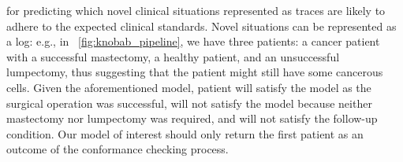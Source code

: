 for predicting which novel clinical situations represented as %
traces are likely to adhere to the expected clinical standards. Novel situations can be represented as a log: e.g., in \figurename~\ref{fig:knobab_pipeline}, we have three patients:  a cancer patient with a successful mastectomy,  a healthy patient, and  an unsuccessful lumpectomy, thus suggesting that the patient might still have some cancerous cells. Given the aforementioned model, patient  will satisfy the model as the surgical operation was successful,    will not satisfy the model because neither mastectomy nor lumpectomy was required, and  will not satisfy the follow-up condition. Our model of interest should only return the first patient as an outcome of the conformance checking process.




